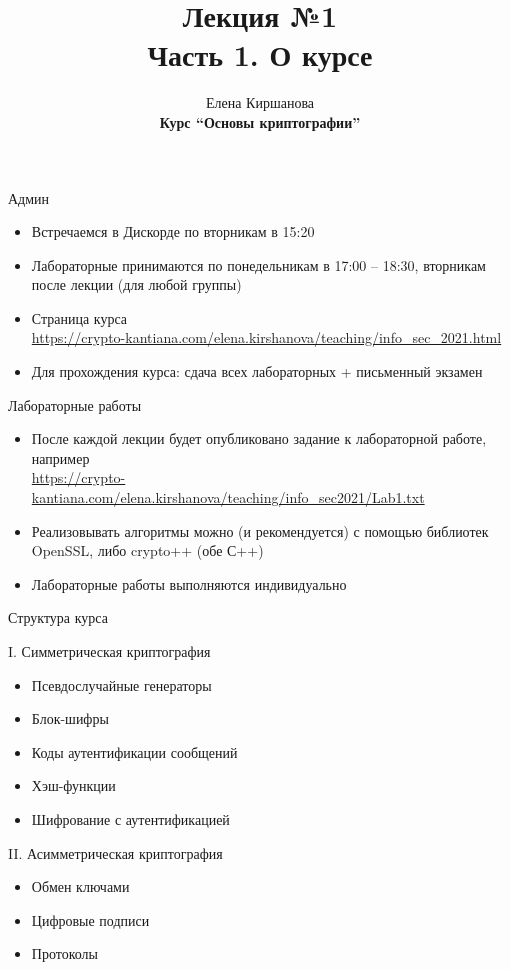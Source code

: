 \documentclass[usenames,dvipsnames,8pt,aspectratio=169]{beamer}
\title{Лекция №1 \\[10pt]
		Часть 1. О курсе}
\date{ Елена Киршанова \\  \textbf{Курс ``Основы криптографии''} \\  }
\begin{document}
	
\begin{frame}
	\titlepage
\end{frame}


\begin{frame}{Админ}
\Large
\begin{itemize}
	\itemsep 12pt
	\item Встречаемся в Дискорде по вторникам в 15:20
	\item Лабораторные принимаются по понедельникам в 17:00 -- 18:30, вторникам после лекции (для любой группы)
	\item Страница курса  \\
	\url{https://crypto-kantiana.com/elena.kirshanova/teaching/info_sec\_2021.html}
	\item Для прохождения курса: сдача всех лабораторных + письменный экзамен
\end{itemize}
\end{frame}


\begin{frame}{Лабораторные работы}
\Large
\begin{itemize}
	\itemsep 12pt
	\item После каждой лекции будет опубликовано задание к лабораторной работе, например\\
	\url{https://crypto-kantiana.com/elena.kirshanova/teaching/info_sec2021/Lab1.txt}
	\item Реализовывать алгоритмы можно (и рекомендуется) с помощью библиотек OpenSSL, либо crypto++ (обе С++)
	\item Лабораторные работы выполняются индивидуально
\end{itemize}
\end{frame}

\begin{frame}{Структура курса}

\Large
{\color{Orange} I. Симметрическая криптография} \\[10pt]
\begin{itemize}
	\item Псевдослучайные генераторы
	\item Блок-шифры
	\item Коды аутентификации сообщений 
	\item Хэш-функции
	\item Шифрование  с аутентификацией
\end{itemize}

\vspace{20pt}
{\color{Orange} II. Асимметрическая криптография}

\begin{itemize}
	\item Обмен ключами
	\item Цифровые подписи
	\item Протоколы
\end{itemize}

\end{frame}
\end{document}
